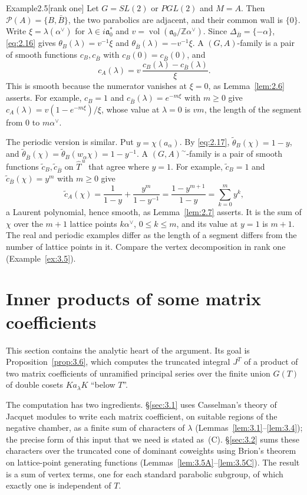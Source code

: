 \documentclass[12pt,letterpaper]{article}
\numberwithin{equation}{section}
\theoremstyle{plain}
\theoremstyle{remark}
\theoremstyle{plain}
\theoremstyle{definition}
\theoremstyle{remark}
\theoremstyle{remark}
\newcommand{\cP}{\mathcal{P}}
\newcommand{\fa}{\mathfrak{a}}
\newcommand{\Thu}{\widehat{T}^{\,u}}
\DeclareMathOperator{\vol}{vol}
\begin{document}
\begin{fixedrem}{Example}{2.5}[rank one]\label{ex:2.5}
Let $G=SL(2)$ or $PGL(2)$ and $M=A$. Then $\cP(A)=\{B,\bar B\}$, the two parabolics are adjacent, and their common wall is $\{0\}$. Write $\xi=\lambda(\alpha^\vee)$ for $\lambda\in i\fa_0^*$ and $v=\vol(\fa_0/\mathbb{Z}\alpha^\vee)$. Since $\Delta_{\bar B}=\{-\alpha\}$, \eqref{eq:2.16} gives $\theta_B(\lambda)=v^{-1}\xi$ and $\theta_{\bar B}(\lambda)=-v^{-1}\xi$. A $(G,A)$-family is a pair of smooth functions $c_B,c_{\bar B}$ with $c_B(0)=c_{\bar B}(0)$, and
\[
c_A(\lambda)=v\,\frac{c_B(\lambda)-c_{\bar B}(\lambda)}{\xi}.
\]
This is smooth because the numerator vanishes at $\xi=0$, as Lemma~\ref{lem:2.6} asserts. For example, $c_B=1$ and $c_{\bar B}(\lambda)=e^{-m\xi}$ with $m\ge0$ give $c_A(\lambda)=v(1-e^{-m\xi})/\xi$, whose value at $\lambda=0$ is $vm$, the length of the segment from $0$ to $m\alpha^\vee$.

The periodic version is similar. Put $y=\chi(a_\alpha)$. By \eqref{eq:2.17}, $\tilde\theta_B(\chi)=1-y$, and $\tilde\theta_{\bar B}(\chi)=\tilde\theta_B(w_\alpha\chi)=1-y^{-1}$. A $(G,A)^\sim$-family is a pair of smooth functions $\tilde c_B,\tilde c_{\bar B}$ on $\Thu$ that agree where $y=1$. For example, $\tilde c_B=1$ and $\tilde c_{\bar B}(\chi)=y^m$ with $m\ge0$ give
\[
\tilde c_A(\chi)=\frac1{1-y}+\frac{y^m}{1-y^{-1}}=\frac{1-y^{m+1}}{1-y}=\sum_{k=0}^my^k,
\]
a Laurent polynomial, hence smooth, as Lemma~\ref{lem:2.7} asserts. It is the sum of $\chi$ over the $m+1$ lattice points $k\alpha^\vee$, $0\le k\le m$, and its value at $y=1$ is $m+1$. The real and periodic examples differ as the length of a segment differs from the number of lattice points in it. Compare the vertex decomposition in rank one (Example~\ref{ex:3.5}).
\end{fixedrem}

\section{Inner products of some matrix coefficients}\label{sec:3}

This section contains the analytic heart of the argument. Its goal is Proposition~\ref{prop:3.6}, which computes the truncated integral $J^T$ of a product of two matrix coefficients of unramified principal series over the finite union $G(T)$ of double cosets $Ka_\lambda K$ ``below $T$''.

The computation has two ingredients. \S\ref{sec:3.1} uses Casselman's theory of Jacquet modules to write each matrix coefficient, on suitable regions of the negative chamber, as a finite sum of characters of $\lambda$ (Lemmas~\ref{lem:3.1}--\ref{lem:3.4}); the precise form of this input that we need is stated as~(C). \S\ref{sec:3.2} sums these characters over the truncated cone of dominant coweights using Brion's theorem on lattice-point generating functions (Lemmas~\ref{lem:3.5A}--\ref{lem:3.5C}). The result is a sum of vertex terms, one for each standard parabolic subgroup, of which exactly one is independent of $T$.
\end{document}
